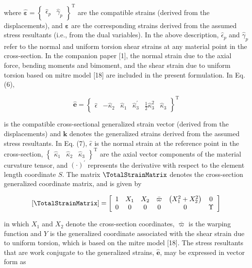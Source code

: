 where $\widehat{\bm{\varepsilon}}=\left\{\begin{array}{ll}\hat{\epsilon}_p & \hat{\gamma}_p\end{array}\right\}^{\mathrm{T}}$ are the compatible strains (derived from the displacements), and $\bm{\varepsilon}$ are the corresponding strains derived from the assumed stress resultants (i.e., from the dual variables). In the above description, $\hat{\epsilon}_p$ and $\hat{\gamma}_p$ refer to the normal and uniform torsion shear strains at any material point in the cross-section. In the companion paper [1], the normal strain due to the axial force, bending moments and bimoment, and the shear strain due to uniform torsion based on mitre model [18] are included in the present formulation. 
In Eq. (6),

$$
\hat{\bm{e}}=\left\{\begin{array}{llllll}
\hat{\epsilon} & -\hat{\kappa}_2 & \hat{\kappa}_1 & \hat{\kappa}_3^{\prime} & \frac{1}{2} \hat{\kappa}_3^2 & \hat{\kappa}_3
\end{array}\right\}^{\mathrm{T}}
$$

is the compatible cross-sectional generalized strain vector (derived from the displacements) and $\mathbf{k}$ denotes the generalized strains derived from the assumed stress resultants. In Eq. (7), $\hat{\epsilon}$ is the normal strain at the reference point in the cross-section, $\left\{\begin{array}{lll}\hat{\kappa}_1 & \hat{\kappa}_2 & \hat{\kappa}_3\end{array}\right\}^{\mathrm{T}}$ are the axial vector components of the material curvature tensor, and $(\cdot)^{\prime}$ represents the derivative with respect to the element length coordinate $S$. The matrix $\TotalStrainMatrix$ denotes the cross-section generalized coordinate matrix, and is given by

$$
[\TotalStrainMatrix]=\left[\begin{array}{cccccc}
1 & X_1 & X_2 & \bar{\varpi} & \left(X_1^2+X_2^2\right) & 0 \\
0 & 0 & 0 & 0 & 0 & \Upsilon
\end{array}\right]
$$

in which $X_1$ and $X_2$ denote the cross-section coordinates, $\bar{\varpi}$ is the warping function and $Y$ is the generalized coordinate associated with the shear strain due to uniform torsion, which is based on the mitre model [18]. The stress resultants that are work conjugate to the generalized strains, $\hat{\bm{e}}$, may be expressed in vector form as

